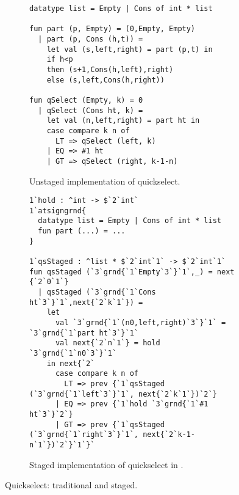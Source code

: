 
\begin{figure*}
\begin{subfigure}{0.5\textwidth}
\begin{lstlisting} 
datatype list = Empty | Cons of int * list

fun part (p, Empty) = (0,Empty, Empty) 
  | part (p, Cons (h,t)) = 
    let val (s,left,right) = part (p,t) in 
    if h<p 
    then (s+1,Cons(h,left),right) 
    else (s,left,Cons(h,right))

fun qSelect (Empty, k) = 0
  | qSelect (Cons ht, k) =
    let val (n,left,right) = part ht in
    case compare k n of
      LT => qSelect (left, k)
    | EQ => #1 ht
    | GT => qSelect (right, k-1-n)
\end{lstlisting}
\caption{Unstaged implementation of quickselect.}
\label{fig:qs-unstaged}
\end{subfigure}
\begin{subfigure}{0.5\textwidth}
\begin{lstlisting} 
1`hold : ^int -> $`2`int`
1`atsigngrnd{
  datatype list = Empty | Cons of int * list
  fun part (...) = ...
}

1`qsStaged : ^list * $`2`int`1` -> $`2`int`1`
fun qsStaged (`3`grnd{`1`Empty`3`}`1`,_) = next {`2`0`1`}
  | qsStaged (`3`grnd{`1`Cons ht`3`}`1`,next{`2`k`1`}) = 
    let 
      val `3`grnd{`1`(n0,left,right)`3`}`1` = `3`grnd{`1`part ht`3`}`1`
      val next{`2`n`1`} = hold `3`grnd{`1`n0`3`}`1`
    in next{`2`
      case compare k n of
        LT => prev {`1`qsStaged (`3`grnd{`1`left`3`}`1`, next{`2`k`1`})`2`}
      | EQ => prev {`1`hold `3`grnd{`1`#1 ht`3`}`2`}
      | GT => prev {`1`qsStaged (`3`grnd{`1`right`3`}`1`, next{`2`k-1-n`1`})`2`}`1`}`
\end{lstlisting}
\caption{Staged implementation of quickselect in \lang.}
\label{fig:qs-staged}
\end{subfigure}
\caption{Quickselect: traditional and staged.}
\end{figure*}

